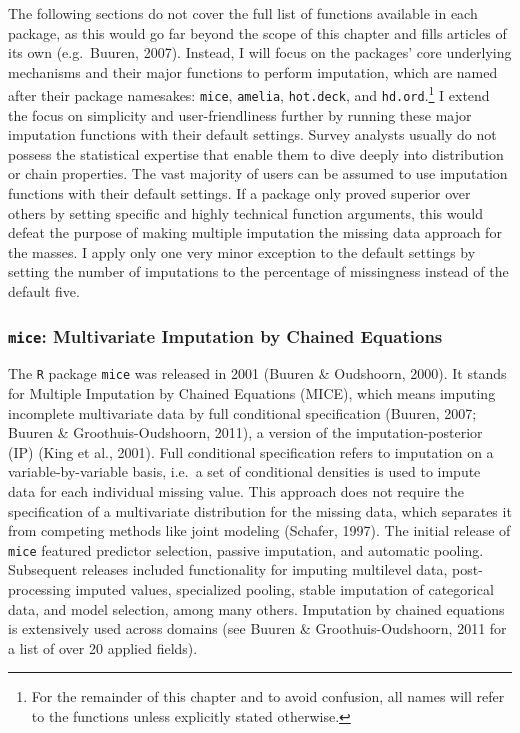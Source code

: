 \documentclass[12pt,econ]{sources/authesis}
\begin{document}
The following sections do not cover the full list of functions available in each package, as this would go far beyond the scope of this chapter and fills articles of its own (e.g.~Buuren, 2007). Instead, I will focus on the packages' core underlying mechanisms and their major functions to perform imputation, which are named after their package namesakes: \texttt{mice}, \texttt{amelia}, \texttt{hot.deck}, and \texttt{hd.ord}.\footnote{For the remainder of this chapter and to avoid confusion, all names will refer to the functions unless explicitly stated otherwise.} I extend the focus on simplicity and user-friendliness further by running these major imputation functions with their default settings. Survey analysts usually do not possess the statistical expertise that enable them to dive deeply into distribution or chain properties. The vast majority of users can be assumed to use imputation functions with their default settings. If a package only proved superior over others by setting specific and highly technical function arguments, this would defeat the purpose of making multiple imputation the missing data approach for the masses. I apply only one very minor exception to the default settings by setting the number of imputations to the percentage of missingness instead of the default five.

\hypertarget{ordmiss-theory-multimpute-mice}{%
\subsubsection{\texorpdfstring{\texttt{mice}: Multivariate Imputation by Chained Equations}{mice: Multivariate Imputation by Chained Equations}}\label{ordmiss-theory-multimpute-mice}}

The \texttt{R} package \texttt{mice} was released in 2001 (Buuren \& Oudshoorn, 2000). It stands for Multiple Imputation by Chained Equations (MICE), which means imputing incomplete multivariate data by full conditional specification (Buuren, 2007; Buuren \& Groothuis-Oudshoorn, 2011), a version of the imputation-posterior (IP) (King et al., 2001). Full conditional specification refers to imputation on a variable-by-variable basis, i.e.~a set of conditional densities is used to impute data for each individual missing value. This approach does not require the specification of a multivariate distribution for the missing data, which separates it from competing methods like joint modeling (Schafer, 1997). The initial release of \texttt{mice} featured predictor selection, passive imputation, and automatic pooling. Subsequent releases included functionality for imputing multilevel data, post-processing imputed values, specialized pooling, stable imputation of categorical data, and model selection, among many others. Imputation by chained equations is extensively used across domains (see Buuren \& Groothuis-Oudshoorn, 2011 for a list of over 20 applied fields).
\end{document}
